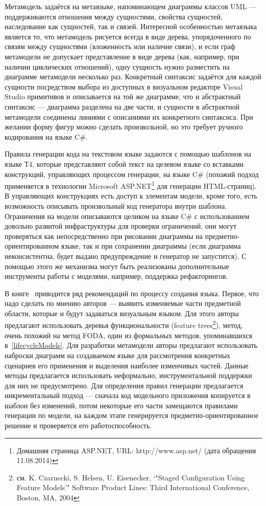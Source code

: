 Метамодель задаётся на метаязыке, напоминающем диаграммы классов UML --- поддерживаются
отношения между сущностями, свойства сущностей, наследование как сущностей, так и связей.
Интересной особенностью метаязыка является то, что метамодель рисуется всегда в виде дерева,
упорядоченного по связям между сущностями (вложенность или наличие связи), и если граф метамодели
не допускает представление в виде дерева (как, например, при наличии циклических отношений),
одну сущность нужно разместить на диаграмме метамодели несколько раз. Конкретный синтаксис
задаётся для каждой сущности посредством выбора из доступных в визуальном редакторе Visual Studio
примитивов и описывается на той же диаграмме, что и абстрактный синтаксис --- диаграмма
разделена на две части, и сущности в абстрактной метамодели соединены линиями с описаниями их конкретного синтаксиса.
При желании форму фигур можно сделать произвольной, но это требует ручного кодирования на языке C\#.

Правила генерации кода на текстовом языке задаются с помощью шаблонов на языке Т4, которые
представляют собой текст на целевом языке со вставками конструкций, управляющих процессом 
генерации, на языке C\# (похожий подход применяется в технологии Microsoft ASP.NET\footnote
{Домашняя страница ASP.NET, URL: http://www.asp.net/ (дата обращения 11.08.2014)}
для генерации HTML-страниц). В управляющих конструкциях есть доступ к элементам модели, кроме того,
есть возможность описывать произвольный код генератора внутри шаблона. Ограничения на модели
описываются целиком на языке C\# с использованием довольно развитой инфраструктуры для
проверки ограничений, они могут проверяться как непосредственно при рисовании диаграммы
на предметно-ориентированном языке, так и при сохранении диаграммы (если диаграмма 
неконсистентна, будет выдано предупреждение и генератор не запустится). С помощью этого
же механизма могут быть реализованы дополнительные инструменты работы с моделями, например,
поддержка рефакторингов.

В книге~\cite{cook2007domain} приводится ряд рекомендаций по процессу создания языка.
Первое, что надо сделать по мнению авторов --- выявить изменяемые части предметной области,
которые и будут задаваться визуальным языком. Для этого авторы предлагают использовать
деревья функциональности (feature trees\footnote{см. K. Czarnecki, S. Helsen, U. Eisenecker, `"Staged Configuration
Using Feature Models'" Software Product Lines: Third International Conference, Boston, MA, 2004}),
метод, очень похожий на метод FODA, один из формальных методов, упоминавшихся в~\ref{lifecycleModels}.
Для разработки метамодели авторы предлагают использовать наброски диаграмм на создаваемом языке
для рассмотрения конкретных сценариев его применения и выделения наиболее изменчивых частей.
Данные методы предлагается использовать неформально, инструментальной поддержки для них не предусмотрено.
Для определения правил генерации предлагается инкрементальный подход --- сначала код модельного
приложения копируется в шаблон без изменений, потом некоторые его части замещаются правилами генерации
по модели, на каждом этапе генерируется предметно-ориентированное решение и проверяется
его работоспособность.

